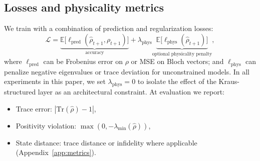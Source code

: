 \documentclass{article} %
\providecommand{\Tr}{\mathrm{Tr}}
\providecommand{\cL}{\mathcal{L}}
\providecommand{\rh}{\rho}
\begin{document}
\subsection{Losses and physicality metrics}
We train with a combination of prediction and regularization losses:
\begin{equation}
\cL = \underbrace{\mathbb{E}\big[\ell_{\text{pred}}(\widehat{\rh}_{t+1},\rh_{t+1})\big]}_{\text{accuracy}}
+ \lambda_{\text{phys}} \underbrace{\mathbb{E}\big[\ell_{\text{phys}}(\widehat{\rh}_{t+1})\big]}_{\text{optional physicality penalty}},
\end{equation}
where $\ell_{\text{pred}}$ can be Frobenius error on $\rh$ or MSE on Bloch vectors; and $\ell_{\text{phys}}$ can penalize negative eigenvalues or trace deviation for unconstrained models. In all experiments in this paper, we set $\lambda_{\text{phys}}=0$ to isolate the effect of the Kraus-structured layer as an architectural constraint.
At evaluation we report:
\begin{itemize}
  \item Trace error: $|\Tr(\widehat{\rh})-1|$,
  \item Positivity violation: $\max(0,-\lambda_{\min}(\widehat{\rh}))$,
  \item State distance: trace distance or infidelity where applicable (Appendix~\ref{app:metrics}).
\end{itemize}


\end{document}

